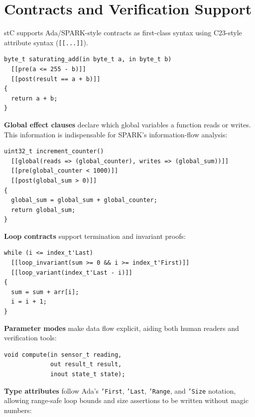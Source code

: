 \documentclass[runningheads]{llncs}
\begin{document}
\section{Contracts and Verification Support}
\label{sec:contracts}

stC supports Ada/SPARK-style contracts as first-class syntax using
C23-style attribute syntax (\texttt{[[...]]}).

\begin{lstlisting}[caption={Pre/post-condition contracts}]
byte_t saturating_add(in byte_t a, in byte_t b)
  [[pre(a <= 255 - b)]]
  [[post(result == a + b)]]
{
  return a + b;
}
\end{lstlisting}

\noindent\textbf{Global effect clauses} declare which global variables a
function reads or writes. This information is indispensable for SPARK's
information-flow analysis:

\begin{lstlisting}[caption={Global effect and contracts}]
uint32_t increment_counter()
  [[global(reads => (global_counter), writes => (global_sum))]]
  [[pre(global_counter < 1000)]]
  [[post(global_sum > 0)]]
{
  global_sum = global_sum + global_counter;
  return global_sum;
}
\end{lstlisting}

\noindent\textbf{Loop contracts} support termination and invariant proofs:

\begin{lstlisting}[caption={Loop invariant and variant}]
while (i <= index_t'Last)
  [[loop_invariant(sum >= 0 && i >= index_t'First)]]
  [[loop_variant(index_t'Last - i)]]
{
  sum = sum + arr[i];
  i = i + 1;
}
\end{lstlisting}

\noindent\textbf{Parameter modes} make data flow explicit, aiding both human
readers and verification tools:

\begin{lstlisting}[caption={Parameter modes}]
void compute(in sensor_t reading,
             out result_t result,
             inout state_t state);
\end{lstlisting}

\noindent\textbf{Type attributes} follow Ada's \texttt{'First}, \texttt{'Last},
\texttt{'Range}, and \texttt{'Size} notation, allowing range-safe loop bounds
and size assertions to be written without magic numbers:
\end{document}
